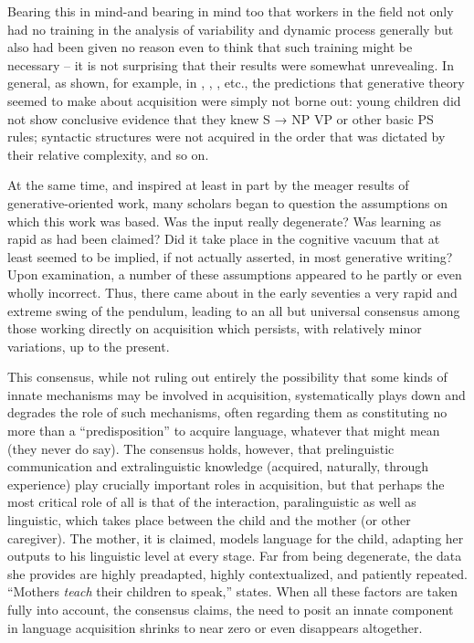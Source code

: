 Bearing this in mind-and bearing in mind too that workers in the field not only had no training in the analysis of variability and dynamic process generally but also had been given no reason even to think that such training might be necessary -- it is not surprising that their results were somewhat unrevealing. In general, as shown, for example, in \citet{BrownEtAl1970}, \citet{Brown1973}, \citet{Bowerman1973}, etc., the predictions that generative theory seemed to make about acquisition were simply not borne out: young children did not show conclusive evidence that they knew S → NP VP or other basic PS
rules; syntactic structures were not acquired in the order that was dictated by their relative complexity, and so on.

At the same time, and inspired at least in part by the meager results of generative-oriented work, many scholars began to question the assumptions on which this work was based. Was the input really degenerate? Was learning as rapid as had been claimed? Did it take place in the cognitive vacuum that at least seemed to be implied, if not actually asserted, in most generative writing? Upon examination, a number of these assumptions appeared to he partly or even wholly incorrect. Thus, there came about in the early seventies a very rapid and extreme swing of the pendulum, leading to an all but universal consensus among those working directly on acquisition which persists, with relatively minor variations, up to the present.

This consensus, while not ruling out entirely the possibility that some kinds of innate mechanisms may be involved in acquisition, systematically plays down and degrades the role of such mechanisms, often regarding them as constituting no more than a ``predisposition'' to acquire language, whatever that might mean (they never do say). The consensus holds, however, that prelinguistic communication and extralinguistic knowledge (acquired, naturally, through experience) play crucially important roles in acquisition, but that perhaps the most critical role of all is that of the interaction, paralinguistic as well as linguistic, which takes place between the child and the mother (or other caregiver). The mother, it is claimed, models language for the child, adapting her outputs to his linguistic level at every stage. Far from being degenerate, the data she provides are highly preadapted, highly contextualized, and patiently repeated. ``Mothers \textit{teach} their children to speak,'' \citet{Bruner1979} states. When all these factors are taken fully into account, the consensus claims, the need to posit an innate component in language acquisition shrinks to near zero or even disappears altogether.

